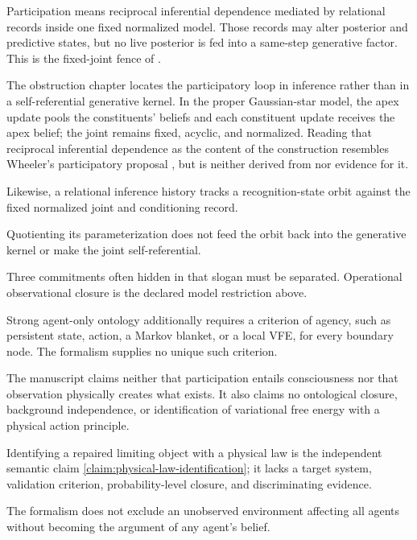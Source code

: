 Participation means reciprocal inferential dependence mediated by relational
records inside one fixed normalized model.  Those records may alter posterior
and predictive states, but no live posterior is fed into a same-step
generative factor.  This is the fixed-joint fence of
. 

The obstruction chapter locates the participatory loop in inference rather
than in a self-referential generative kernel.  In the proper Gaussian-star
model, the apex update pools the constituents' beliefs and each constituent
update receives the apex belief; the joint remains fixed, acyclic, and
normalized.  Reading that reciprocal inferential dependence as the content of
the construction resembles Wheeler's participatory proposal
\citep{Wheeler1990}, but is neither derived from nor evidence for it.

Likewise, a relational inference history tracks a recognition-state orbit
against the fixed normalized joint and conditioning record. 

Quotienting its
parameterization does not feed the orbit back into the generative kernel or
make the joint self-referential. 

Three commitments often hidden in that slogan must be separated.
Operational observational closure is the declared model restriction above.

Strong agent-only ontology additionally requires a
criterion of agency, such as persistent state, action, a Markov blanket, or a
local VFE, for every boundary node. The formalism supplies no unique such
criterion. 

The manuscript claims neither that participation entails consciousness nor
that observation physically creates what exists.  It also claims no
ontological closure, background independence, or identification of
variational free energy with a physical action principle.

Identifying a repaired limiting object with a physical
law is the independent semantic claim
\ref{claim:physical-law-identification}; it lacks a target system, validation
criterion, probability-level closure, and discriminating evidence.

The formalism does not exclude an unobserved environment affecting all agents
without becoming the argument of any agent's belief. 

